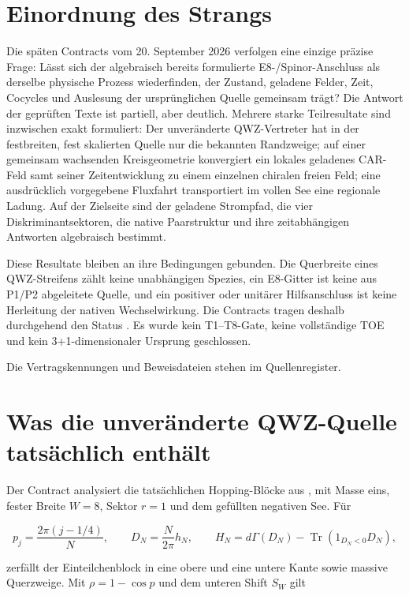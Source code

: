 \section{Einordnung des Strangs}

Die späten Contracts vom 20. September 2026 verfolgen eine einzige präzise
Frage: Lässt sich der algebraisch bereits formulierte E8-/Spinor-Anschluss als
derselbe physische Prozess wiederfinden, der Zustand, geladene Felder, Zeit,
Cocycles und Auslesung der ursprünglichen Quelle gemeinsam trägt? Die
Antwort der geprüften Texte ist partiell, aber deutlich. Mehrere starke
Teilresultate sind inzwischen exakt formuliert: Der unveränderte QWZ-Vertreter
hat in der festbreiten, fest skalierten Quelle nur die bekannten Randzweige;
auf einer gemeinsam wachsenden Kreisgeometrie konvergiert ein lokales geladenes
CAR-Feld samt seiner Zeitentwicklung zu einem einzelnen chiralen freien Feld;
eine ausdrücklich vorgegebene Fluxfahrt transportiert im vollen See eine
regionale Ladung. Auf der Zielseite sind der geladene Strompfad, die vier
Diskriminantsektoren, die native Paarstruktur und ihre zeitabhängigen
Antworten algebraisch bestimmt.

Diese Resultate bleiben an ihre Bedingungen gebunden. Die Querbreite eines
QWZ-Streifens zählt keine unabhängigen Spezies, ein E8-Gitter ist keine aus
P1/P2 abgeleitete Quelle, und ein positiver oder unitärer Hilfsanschluss ist
keine Herleitung der nativen Wechselwirkung. Die Contracts tragen deshalb
durchgehend den Status \texttt{}. Es wurde kein T1--T8-Gate, keine vollständige
TOE und kein 3+1-dimensionaler Ursprung geschlossen.

Die Vertragskennungen und Beweisdateien stehen im Quellenregister.

\section{Was die unveränderte QWZ-Quelle tatsächlich enthält}

Der Contract  analysiert die tatsächlichen
Hopping-Blöcke aus , mit Masse eins,
fester Breite $W=8$, Sektor $r=1$ und dem gefüllten negativen See. Für

\[
 p_j=\frac{2\pi(j-1/4)}{N},\qquad D_N=\frac{N}{2\pi}h_N,\qquad
 H_N=d\Gamma(D_N)-\operatorname{Tr}(1_{D_N<0}D_N),
\]

zerfällt der Einteilchenblock in eine obere und eine untere Kante sowie
massive Querzweige. Mit \(\rho=1-\cos p\) und dem unteren Shift \(S_W\) gilt


